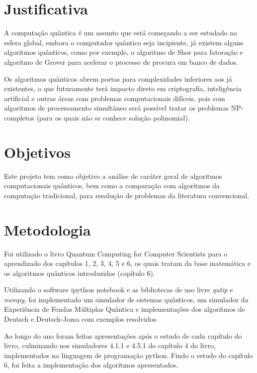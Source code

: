 \documentclass[pfc]{imetex}
\begin{document}
\section{Justificativa}
A computação quântica é um assunto que está começando a ser estudado na esfera global, embora o computador quântico seja incipiente, já existem alguns algoritmos quânticos, como por exemplo, o algoritmo de Shor para fatoração e algoritmo de Grover para acelerar o processo de procura em banco de dados.
 
Os algoritmos quânticos abrem portas para complexidades inferiores aos já existentes, o que futuramente terá impacto direto em criptografia, inteligência artificial e outras áreas com problemas computacionais difíceis, pois com algoritmos de processamento simultâneo será possível tratar os problemas NP-completos (para os quais não se conhece solução polinomial).

\section{Objetivos}
Este projeto tem como objetivo a análise de caráter geral de algoritmos computacionais quânticos, bem como a comparação com algoritmos da computação tradicional, para resolução de problemas da literatura convencional.

\section{Metodologia}
Foi utilizado o livro Quantum Computing for Computer Scientists para o aprendizado dos capítulos 1, 2, 3, 4, 5 e 6, os quais tratam da base matemática e os algoritmos quânticos introduzidos (capítulo 6).

Utilizando o software ipython notebook e as bibliotecas de uso livre \emph{qutip} e \emph{numpy}, foi implementado um simulador de sistemas quânticos, um simulador da Experiência de Fendas Múltiplas Quântica e implementações dos algoritmos de Deutsch e Deutsch-Jozsa com exemplos resolvidos.

Ao longo do ano foram feitas apresentações após o estudo de cada capítulo do livro, culminando nos simuladores 4.1.1 e 4.5.1 do capítulo 4 do livro, implementados na linguagem de programação python. Findo o estudo do capítulo 6, foi feita a implementação dos algoritmos apresentados.
\end{document}
